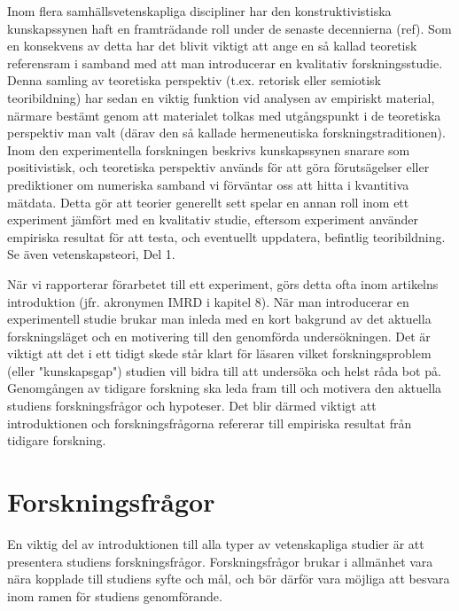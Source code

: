 \documentclass[
]{book}
\begin{document}
Inom flera samhällsvetenskapliga discipliner har den konstruktivistiska kunskapssynen haft en framträdande roll under de senaste decennierna (ref). Som en konsekvens av detta har det blivit viktigt att ange en så kallad teoretisk referensram i samband med att man introducerar en kvalitativ forskningsstudie. Denna samling av teoretiska perspektiv (t.ex. retorisk eller semiotisk teoribildning) har sedan en viktig funktion vid analysen av empiriskt material, närmare bestämt genom att materialet tolkas med utgångspunkt i de teoretiska perspektiv man valt (därav den så kallade hermeneutiska forskningstraditionen). Inom den experimentella forskningen beskrivs kunskapssynen snarare som positivistisk, och teoretiska perspektiv används för att göra förutsägelser eller prediktioner om numeriska samband vi förväntar oss att hitta i kvantitiva mätdata. Detta gör att teorier generellt sett spelar en annan roll inom ett experiment jämfört med en kvalitativ studie, eftersom experiment använder empiriska resultat för att testa, och eventuellt uppdatera, befintlig teoribildning. Se även vetenskapsteori, Del 1.

När vi rapporterar förarbetet till ett experiment, görs detta ofta inom artikelns introduktion (jfr. akronymen IMRD i kapitel 8). När man introducerar en experimentell studie brukar man inleda med en kort bakgrund av det aktuella forskningsläget och en motivering till den genomförda undersökningen. Det är viktigt att det i ett tidigt skede står klart för läsaren vilket forskningsproblem (eller "kunskapsgap") studien vill bidra till att undersöka och helst råda bot på. Genomgången av tidigare forskning ska leda fram till och motivera den aktuella studiens forskningsfrågor och hypoteser. Det blir därmed viktigt att introduktionen och forskningsfrågorna refererar till empiriska resultat från tidigare forskning.

\hypertarget{sec06.1}{%
\section{Forskningsfrågor}\label{sec06.1}}

En viktig del av introduktionen till alla typer av vetenskapliga studier är att presentera studiens forskningsfrågor. Forskningsfrågor brukar i allmänhet vara nära kopplade till studiens syfte och mål, och bör därför vara möjliga att besvara inom ramen för studiens genomförande.
\end{document}
